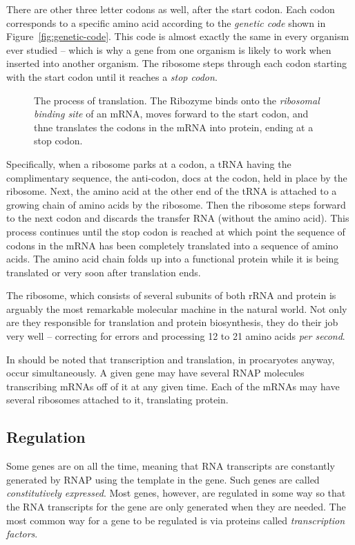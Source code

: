 There are other three letter codons as well, after the start
codon. Each codon corresponds to a specific amino acid according to the
{\em genetic code} shown in Figure~\ref{fig:genetic-code}. This code
is almost exactly the same in every organism ever studied -- which is
why a gene from one organism is likely to work when inserted into
another organism. The ribosome steps through each codon starting with
the start codon until it reaches a {\em stop codon}. 

\begin{figure}
\centering
{}
\caption{\label{fig:translation} The process of translation. The
  Ribozyme binds onto the {\em ribosomal binding site} of an mRNA,
  moves forward to the start codon, and thne translates the codons in the
  mRNA into protein, ending at a stop codon.}
\end{figure}

Specifically, when a ribosome parks at a codon, a tRNA having the
complimentary sequence, the anti-codon, docs at the codon, held in
place by the ribosome. Next, the amino acid at the other end of the
tRNA is attached to a growing chain of amino acids by the
ribosome. Then the ribosome steps forward to the next codon and
discards the transfer RNA (without the amino acid). This process
continues until the stop codon is reached at which point the sequence
of codons in the mRNA has been completely translated into a sequence
of amino acids. The amino acid chain folds up into a functional
protein while it is being translated or very soon after translation ends. 

The ribosome, which consists of several subunits of both rRNA and
protein is arguably the most remarkable molecular machine in the
natural world. Not only are they responsible for translation and
protein biosynthesis, they do their job very well -- correcting for
errors and processing 12 to 21 amino acids {\em per second}. 


In should be noted that transcription and translation, in procaryotes
anyway, occur simultaneously. A given gene may have several RNAP
molecules transcribing mRNAs off of it at any given time. Each of the
mRNAs may have several ribosomes attached to it, translating protein.

\subsection{Regulation}

Some genes are on all the time, meaning that RNA transcripts are
constantly generated by RNAP using the template in the gene. Such
genes are called {\em constitutively expressed}. Most genes, however,
are regulated in some way so that the RNA transcripts for the gene are
only generated when they are needed. The most common way for a gene to
be regulated is via proteins called {\em transcription factors}.


